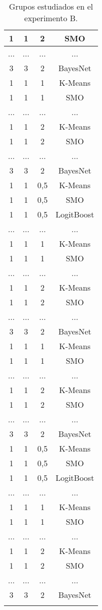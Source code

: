 \begin{longtable}{|c|c|c|c|}
        1 & 1 & 2 & SMO \\ \hline
        ... & ... & ... & ... \\ \hline
        3 & 3 & 2 & BayesNet \\ \hline
        1 & 1 & 1 & K-Means \\ \hline
        1 & 1 & 1 & SMO \\ \hline
        ... & ... & ... & ... \\ \hline
        1 & 1 & 2 & K-Means \\ \hline
        1 & 1 & 2 & SMO \\ \hline
        ... & ... & ... & ... \\ \hline
        3 & 3 & 2 & BayesNet \\ \hline
        1 & 1 & 0,5 & K-Means \\ \hline
        1 & 1 & 0,5 & SMO \\ \hline
        1 & 1 & 0,5 & LogitBoost \\ \hline
        ... & ... & ... & ... \\ \hline
        1 & 1 & 1 & K-Means \\ \hline
        1 & 1 & 1 & SMO \\ \hline
        ... & ... & ... & ... \\ \hline
        1 & 1 & 2 & K-Means \\ \hline
        1 & 1 & 2 & SMO \\ \hline
        ... & ... & ... & ... \\ \hline
        3 & 3 & 2 & BayesNet \\ \hline
        1 & 1 & 1 & K-Means \\ \hline
        1 & 1 & 1 & SMO \\ \hline
        ... & ... & ... & ... \\ \hline
        1 & 1 & 2 & K-Means \\ \hline
        1 & 1 & 2 & SMO \\ \hline
        ... & ... & ... & ... \\ \hline
        3 & 3 & 2 & BayesNet \\ \hline
        1 & 1 & 0,5 & K-Means \\ \hline
        1 & 1 & 0,5 & SMO \\ \hline
        1 & 1 & 0,5 & LogitBoost \\ \hline
        ... & ... & ... & ... \\ \hline
        1 & 1 & 1 & K-Means \\ \hline
        1 & 1 & 1 & SMO \\ \hline
        ... & ... & ... & ... \\ \hline
        1 & 1 & 2 & K-Means \\ \hline
        1 & 1 & 2 & SMO \\ \hline
        ... & ... & ... & ... \\ \hline
        3 & 3 & 2 & BayesNet \\ \hline
        
    
    \caption{Grupos estudiados en el experimento B.}
    \label{tab:gruposB}
\end{longtable}

